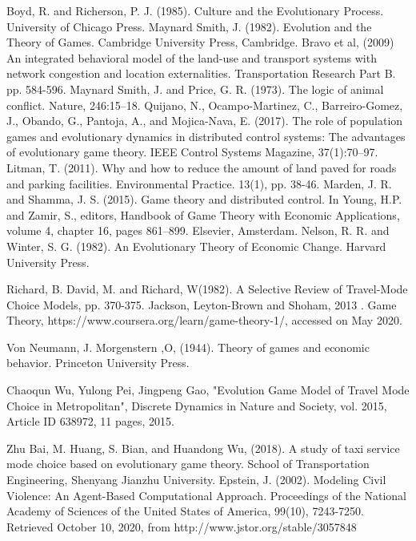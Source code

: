 \documentclass[12pt]{report}
\begin{document}
\begin{thebibliography}{2}
Boyd, R. and Richerson, P. J. (1985). Culture and the Evolutionary Process. University of Chicago Press.
Maynard Smith, J. (1982). Evolution and the Theory of Games. Cambridge University Press, Cambridge.
Bravo et al, (2009) An integrated behavioral model of the land-use and transport systems with network congestion and location externalities. Transportation Research Part B. pp. 584-596.
Maynard Smith, J. and Price, G. R. (1973). The logic of animal conflict. Nature, 246:15–18. 
Quijano, N., Ocampo-Martinez, C., Barreiro-Gomez, J., Obando, G., Pantoja, A., and Mojica-Nava, E. (2017). The role of population games and evolutionary dynamics in distributed control systems: The advantages of evolutionary game theory. IEEE Control Systems Magazine, 37(1):70–97.
Litman, T. (2011). Why and how to reduce the amount of land paved for roads
and parking facilities. Environmental Practice. 13(1), pp. 38-46.
Marden, J. R. and Shamma, J. S. (2015). Game theory and distributed control. In Young, H.P. and Zamir, S., editors, Handbook of Game Theory with Economic Applications, volume 4, chapter 16, pages 861–899. Elsevier, Amsterdam.
Nelson, R. R. and Winter, S. G. (1982). An Evolutionary Theory of Economic Change. Harvard University Press.

Richard, B. David, M. and Richard, W(1982). A Selective Review of Travel-Mode Choice Models, pp. 370-375.
Jackson, Leyton-Brown and Shoham, 2013 . Game Theory, https://www.coursera.org/learn/game-theory-1/, accessed on May 2020. 

Von Neumann, J. Morgenstern ,O, (1944). Theory of games and economic behavior. Princeton University Press.

Chaoqun Wu, Yulong Pei, Jingpeng Gao, "Evolution Game Model of Travel Mode Choice in Metropolitan", Discrete Dynamics in Nature and Society, vol. 2015, Article ID 638972, 11 pages, 2015. 


Zhu Bai, M. Huang, S. Bian, and Huandong Wu, (2018). A study of taxi service mode choice based on evolutionary game theory. School of Transportation Engineering, Shenyang Jianzhu University.
Epstein, J. (2002). Modeling Civil Violence: An Agent-Based Computational Approach. Proceedings of the National Academy of Sciences of the United States of America, 99(10), 7243-7250. Retrieved October 10, 2020, from http://www.jstor.org/stable/3057848
\end{thebibliography}
\end{document}

